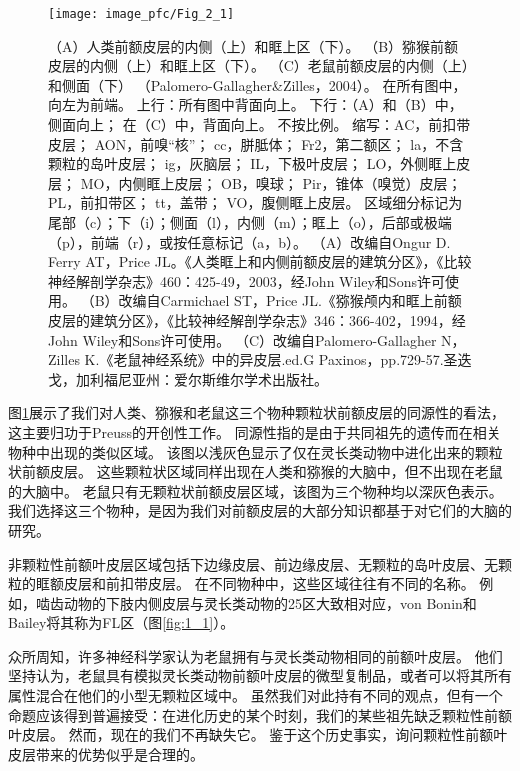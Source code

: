 \begin{figure}[!htb]
	\centering
	\texttt{[image: image\_pfc/Fig\_2\_1]}
	\caption{（A）人类前额皮层的内侧（上）和眶上区（下）\cite{ongur2003architectonic}。 
		（B）猕猴前额皮层的内侧（上）和眶上区（下）\cite{carmichael1994architectonic}。 
		（C）老鼠前额皮层的内侧（上）和侧面（下）
		（Palomero-Gallagher\&Zilles，2004）。
		在所有图中，向左为前端。
		上行：所有图中背面向上。
		下行：（A）和（B）中，侧面向上；
		在（C）中，背面向上。
		不按比例。
		缩写：AC，前扣带皮层；
		AON，前嗅“核”；
		cc，胼胝体；
		Fr2，第二额区；
		la，不含颗粒的岛叶皮层；
		ig，灰脑层；
		IL，下极叶皮层；
		LO，外侧眶上皮层；
		MO，内侧眶上皮层；
		OB，嗅球；
		Pir，锥体（嗅觉）皮层；
		PL，前扣带区；
		tt，盖带；
		VO，腹侧眶上皮层。
		区域细分标记为尾部（c）；下（i）；侧面（l），内侧（m）；眶上（o），后部或极端（p），前端（r），或按任意标记（a，b）。
		（A）改编自Ongur D. Ferry AT，Price JL。《人类眶上和内侧前额皮层的建筑分区》，《比较神经解剖学杂志》460：425-49，2003，经John Wiley和Sons许可使用。 
		（B）改编自Carmichael ST，Price JL.《猕猴颅内和眶上前额皮层的建筑分区》，《比较神经解剖学杂志》346：366-402，1994，经John Wiley和Sons许可使用。 
		（C）改编自Palomero-Gallagher N，Zilles K.《老鼠神经系统》中的异皮层.ed.G Paxinos，pp.729-57.圣迭戈，加利福尼亚州：爱尔斯维尔学术出版社。\label{fig:fig_2_1}}
\end{figure}

图\ref{fig:fig_2_1}展示了我们对人类、猕猴和老鼠这三个物种颗粒状前额皮层的同源性的看法，这主要归功于Preuss\cite{Preuss1991a}的开创性工作。
同源性指的是由于共同祖先的遗传而在相关物种中出现的类似区域。
该图以浅灰色显示了仅在灵长类动物中进化出来的颗粒状前额皮层。
这些颗粒状区域同样出现在人类和猕猴的大脑中，但不出现在老鼠的大脑中。
老鼠只有无颗粒状前额皮层区域，该图为三个物种均以深灰色表示。
我们选择这三个物种，是因为我们对前额皮层的大部分知识都基于对它们的大脑的研究。


非颗粒性前额叶皮层区域包括下边缘皮层、前边缘皮层、无颗粒的岛叶皮层、无颗粒的眶额皮层和前扣带皮层。
在不同物种中，这些区域往往有不同的名称。
例如，啮齿动物的下肢内侧皮层与灵长类动物的25区大致相对应，von Bonin和Bailey将其称为FL区（图\ref{fig:1_1}）。


众所周知，许多神经科学家认为老鼠拥有与灵长类动物相同的前额叶皮层。
他们坚持认为，老鼠具有模拟灵长类动物前额叶皮层的微型复制品，或者可以将其所有属性混合在他们的小型无颗粒区域中\cite{kolb2007all,seamans2008comparing,schoenbaum2009new}。
虽然我们对此持有不同的观点，但有一个命题应该得到普遍接受：在进化历史的某个时刻，我们的某些祖先缺乏颗粒性前额叶皮层。
然而，现在的我们不再缺失它。
鉴于这个历史事实，询问颗粒性前额叶皮层带来的优势似乎是合理的。


